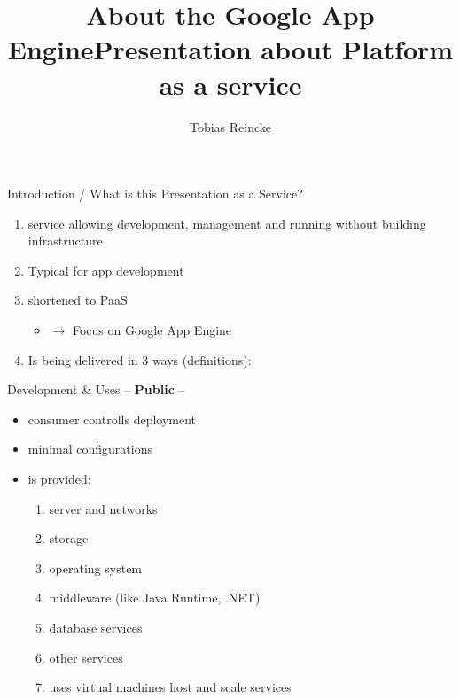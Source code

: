 \documentclass{beamer}
\title{About the Google App Engine}
\author{ Tobias Reincke}
\begin{document}
	
	\title{Presentation about Platform as a service}
\begin{frame}[plain]
    \maketitle
\end{frame}

\begin{frame}{Introduction / What is this Presentation as a Service? }
	\begin{enumerate}[label=]
		\item service allowing development, management and running without building infrastructure
		\item Typical for app development
		\item shortened to PaaS
		
	
		\begin{itemize}
				\item \footnotesize{ $\rightarrow$ Focus on Google App Engine} 
		\end{itemize}
		\item Is being delivered in 3 ways (definitions): 
	\end{enumerate}
\end{frame}
\begin{frame}{Development \& Uses}
    \centering
	--\textbf{ Public} --
	
	\begin{itemize}
	 \item consumer controlls deployment
	 \item minimal configurations
	 \item is provided:
	 
	 \begin{enumerate}[label= \Alph*]
	 	\centering
	 		 \item server and networks 
	 	\item storage 
	 	\item operating system 
	 	\item middleware (like Java Runtime, .NET)
	 	\item database services
	 	\item other services
	 				\item uses virtual machines host and scale services
	 \end{enumerate}

	\end{itemize}
\end{frame}
\end{document}
